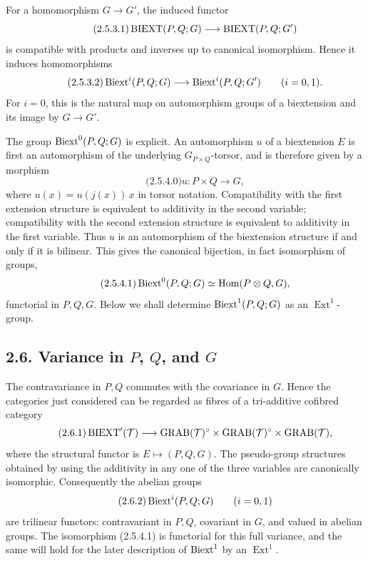 \documentclass[11pt]{article}
\providecommand{\Ext}{\operatorname{Ext}}
\begin{document}
For a homomorphism \(G\to G'\), the induced functor
\begin{equation}\qquad\text{(2.5.3.1)}
  \operatorname{BIEXT}(P,Q;G)\longrightarrow\operatorname{BIEXT}(P,Q;G')
\end{equation}
is compatible with products and inverses up to canonical isomorphism.  Hence it induces homomorphisms
\begin{equation}\qquad\text{(2.5.3.2)}
  \operatorname{Biext}^i(P,Q;G)\longrightarrow\operatorname{Biext}^i(P,Q;G')\qquad (i=0,1).
\end{equation}
For \(i=0\), this is the natural map on automorphism groups of a biextension and its image by \(G\to G'\).

The group \(\operatorname{Biext}^0(P,Q;G)\) is explicit.  An automorphism \(u\) of a biextension \(E\) is first an automorphism of the underlying \(G_{P\times Q}\)-torsor, and is therefore given by a morphism
\begin{equation}\qquad\text{(2.5.4.0)}
  u:P\times Q\longrightarrow G,
\end{equation}
where \(u(x)=u(j(x))\,x\) in torsor notation.  Compatibility with the first extension structure is equivalent to additivity in the second variable; compatibility with the second extension structure is equivalent to additivity in the first variable.  Thus \(u\) is an automorphism of the biextension structure if and only if it is bilinear.  This gives the canonical bijection, in fact isomorphism of groups,
\begin{equation}\qquad\text{(2.5.4.1)}
  \operatorname{Biext}^0(P,Q;G)\simeq\operatorname{Hom}(P\otimes Q,G),
\end{equation}
functorial in \(P,Q,G\).  Below we shall determine \(\operatorname{Biext}^1(P,Q;G)\) as an \(\Ext^1\)-group.

\subsection*{2.6. Variance in \(P\), \(Q\), and \(G\)}
The contravariance in \(P,Q\) commutes with the covariance in \(G\).  Hence the categories just considered can be regarded as fibres of a tri-additive cofibred category
\begin{equation}\qquad\text{(2.6.1)}
  \operatorname{BIEXT}'(\mathcal T)\longrightarrow
  \operatorname{GRAB}(\mathcal T)^\circ\times\operatorname{GRAB}(\mathcal T)^\circ\times\operatorname{GRAB}(\mathcal T),
\end{equation}
where the structural functor is \(E\mapsto(P,Q,G)\).  The pseudo-group structures obtained by using the additivity in any one of the three variables are canonically isomorphic.  Consequently the abelian groups
\begin{equation}\qquad\text{(2.6.2)}
  \operatorname{Biext}^i(P,Q;G)\qquad (i=0,1)
\end{equation}
are trilinear functors: contravariant in \(P,Q\), covariant in \(G\), and valued in abelian groups.  The isomorphism (2.5.4.1) is functorial for this full variance, and the same will hold for the later description of \(\operatorname{Biext}^1\) by an \(\Ext^1\).
\end{document}
